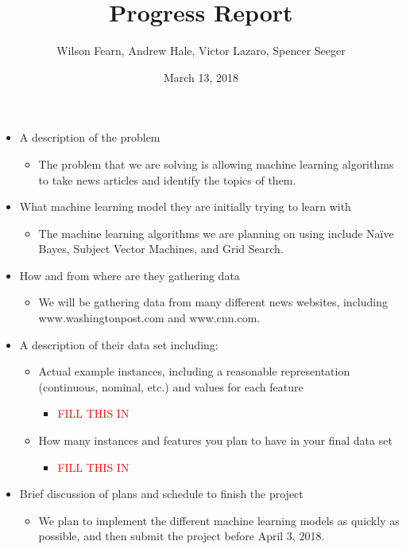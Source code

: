 \documentclass[fleqn,11pt]{article}
\begin{document}
\lstset{
  language=Python,
  basicstyle=\small,          %
  keywordstyle=\bfseries,
  identifierstyle=,           %
  commentstyle=,              %
  stringstyle=\ttfamily,      %
  showstringspaces=false,     %
  numbers=left,
  numberstyle=\tiny,
  numbersep=5pt,
  frame=tb,
}

\title{Progress Report}
\author{Wilson Fearn, Andrew Hale, Victor Lazaro, Spencer Seeger}
\date{March 13, 2018}
\maketitle

\begin{itemize}
  \item A description of the problem
    \begin{itemize}
      \item The problem that we are solving is allowing machine learning algorithms to take news articles and identify the topics of them.
    \end{itemize}
  \item What machine learning model they are initially trying to learn with
    \begin{itemize}
      \item The machine learning algorithms we are planning on using include Na{\"i}ve Bayes, Subject Vector Machines, and Grid Search.
    \end{itemize}
  \item How and from where are they gathering data
    \begin{itemize}
      \item We will be gathering data from many different news websites, including www.washingtonpost.com and www.cnn.com.
    \end{itemize}
  \item A description of their data set including:
    \begin{itemize}
      \item Actual example instances, including a reasonable representation (continuous, nominal, etc.) and values for each feature
        \begin{itemize}
          \item \textcolor{red}{FILL THIS IN}
        \end{itemize}
      \item How many instances and features you plan to have in your final data set
        \begin{itemize}
          \item \textcolor{red}{FILL THIS IN}
        \end{itemize}
    \end{itemize}
    \item Brief discussion of plans and schedule to finish the project
    \begin{itemize}
      \item We plan to implement the different machine learning models as quickly as possible, and then submit the project before April 3, 2018.
    \end{itemize}
\end{itemize}
\end{document}
